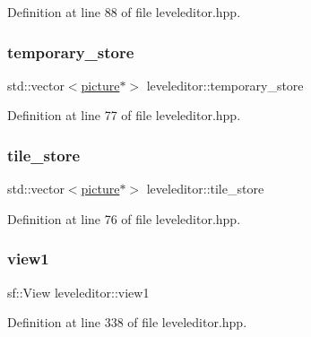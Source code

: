 Definition at line 88 of file leveleditor.\+hpp.

\mbox{\label{classleveleditor_aebecc1e7c65f9bfd0da843b138fd9e68}} 
\subsubsection{\texorpdfstring{temporary\+\_\+store}{temporary\_store}}
{\footnotesize\ttfamily std\+::vector$<$\hyperlink{classpicture}{picture}$\ast$$>$ leveleditor\+::temporary\+\_\+store\hspace{0.3cm}{\ttfamily [private]}}



Definition at line 77 of file leveleditor.\+hpp.

\mbox{\label{classleveleditor_a0af5e07c57e50b3ad3d15d7ae64190ce}} 
\subsubsection{\texorpdfstring{tile\+\_\+store}{tile\_store}}
{\footnotesize\ttfamily std\+::vector$<$\hyperlink{classpicture}{picture}$\ast$$>$ leveleditor\+::tile\+\_\+store\hspace{0.3cm}{\ttfamily [private]}}



Definition at line 76 of file leveleditor.\+hpp.

\mbox{\label{classleveleditor_a8a6367bede4a3a13c41f764f1ac628a4}} 
\subsubsection{\texorpdfstring{view1}{view1}}
{\footnotesize\ttfamily sf\+::\+View leveleditor\+::view1}



Definition at line 338 of file leveleditor.\+hpp.

\mbox{\label{classleveleditor_aa6730359d22f4ea8f82347e29af75afa}} 
